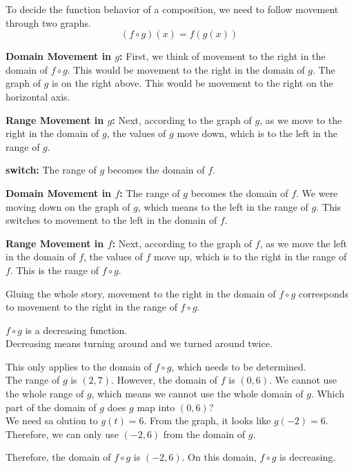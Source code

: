 \documentclass{ximera}
\begin{document}
To decide the function behavior of a composition, we need to follow movement through two graphs. \\



\[
(f \circ g)(x) = f(g(x))
\]



\textbf{\textcolor{blue!55!black}{Domain Movement in $g$:}}  First, we think of movement to the right in the domain of $f \circ g$.  This would be movement to the right in the domain of $g$.  The graph of $g$ is on the right above.  This would be movement to the right on the horizontal axis.



\textbf{\textcolor{blue!55!black}{Range Movement in $g$:}}  Next, according to the graph of $g$, as we move to the right in the domain of $g$, the values of $g$ move down, which is to the left in the range of $g$.




\textbf{\textcolor{blue!55!black}{switch:}}   The range of $g$ becomes the domain of $f$.  


\textbf{\textcolor{blue!55!black}{Domain Movement in $f$:}}   The range of $g$ becomes the domain of $f$.  We were moving down on the graph of $g$, which means to the left in the range of $g$.  This switches to movement to the left in the domain of $f$.


\textbf{\textcolor{blue!55!black}{Range Movement in $f$:}}  Next, according to the graph of $f$, as we move the left in the domain of $f$, the values of $f$ move up, which is to the right in the range of $f$.  This is the range of $f \circ g$.




Gluing the whole story, movement to the right in the domain of $f \circ g$ corresponds to movement to the right in the range of $f \circ g$.

$f \circ g$ is a decreasing function. \\


Decreasing means turning around and we turned around twice. \\


\begin{observation}


This only applies to the domain of $f \circ g$, which needs to be determined. \\



The range of $g$ is $(2, 7)$.  However, the domain of $f$ is $(0, 6)$.   We cannot use the whole range of $g$, which means we cannot use the whole domain of $g$.  Which part of the domain of $g$ does $g$ map into $(0, 6)$? \\


We need sa olution to $g(t) = 6$.  From the graph, it looks like $g(-2) = 6$.  Therefore, we can only use $(-2, 6)$ from the domain of $g$.


Therefore, the domain of $f \circ g$ is $(-2, 6)$.  On this domain, $f \circ g$ is decreasing.



\end{observation}
\end{document}
